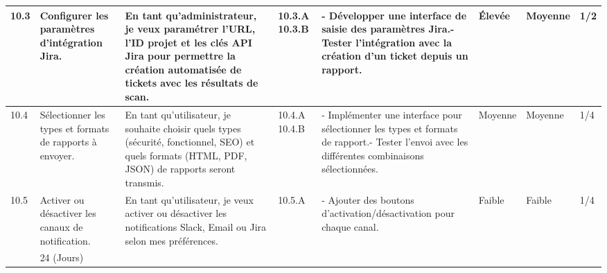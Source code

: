 \begin{landscape}
\begin{spacing}{0.94}
\begin{longtable}{|p{0.6cm}|p{2.6cm}|p{4.9cm}|p{0.97cm}|p{8.6cm}|p{0.35cm}|p{0.35cm}|p{1.6cm}|}
                10.3 & Configurer les paramètres d’intégration Jira. 
                & En tant qu’administrateur, je veux paramétrer l’URL, l’ID projet et les clés API Jira pour permettre la création automatisée de tickets avec les résultats de scan.
                & 10.3.A \newline\vspace{0.5cm}10.3.B
                & - Développer une interface de saisie des paramètres Jira.\newline - Tester l’intégration avec la création d’un ticket depuis un rapport.
                & Élevée & Moyenne & 1/2\\\hline
                
                10.4 & Sélectionner les types et formats de rapports à envoyer. 
                & En tant qu’utilisateur, je souhaite choisir quels types (sécurité, fonctionnel, SEO) et quels formats (HTML, PDF, JSON) de rapports seront transmis.
                & 10.4.A \newline\vspace{0.5cm}10.4.B
                & - Implémenter une interface pour sélectionner les types et formats de rapport.\newline - Tester l’envoi avec les différentes combinaisons sélectionnées.
                & Moyenne & Moyenne & 1/4\\\hline
                
                10.5 & Activer ou désactiver les canaux de notification. 
                & En tant qu’utilisateur, je veux activer ou désactiver les notifications Slack, Email ou Jira selon mes préférences.
                & 10.5.A
                & - Ajouter des boutons d’activation/désactivation pour chaque canal.\newline
                & Faible & Faible & 1/4\\\hline
                

            \rowcolor{gray!20}
			\multicolumn{7}{|c|}{TOTAL} &  24 (Jours)\\
            \hline 
        \end{longtable}
    \end{spacing}
    \vspace{-0.1cm}
\end{landscape}


